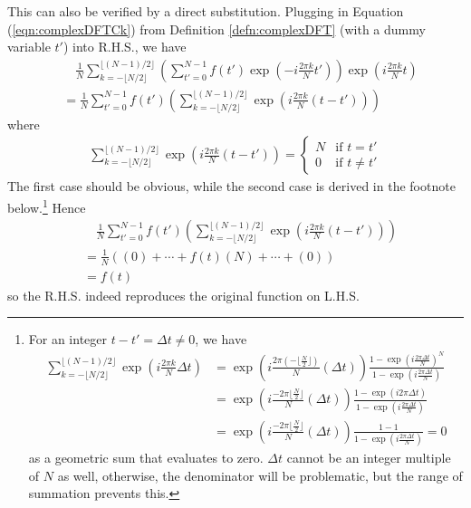 This can also be verified by a direct substitution. Plugging in Equation (\ref{eqn:complexDFTCk}) from Definition \ref{defn:complexDFT} (with a dummy variable $t'$) into R.H.S., we have
\begin{align*}
&\quad \frac{1}{N}\sum_{k= -\lfloor N/2 \rfloor}^{\lfloor (N-1)/2 \rfloor} \left(\sum_{t'=0}^{N-1} f(t')\exp(-i\frac{2\pi k}{N}t')\right) \exp(i\frac{2\pi k}{N}t) \\
&= \frac{1}{N} \sum_{t'=0}^{N-1} f(t') \left(\sum_{k= -\lfloor N/2 \rfloor}^{\lfloor (N-1)/2 \rfloor} \exp(i\frac{2\pi k}{N}(t-t'))\right)
\end{align*}
where
\begin{align}
\sum_{k= -\lfloor N/2 \rfloor}^{\lfloor (N-1)/2 \rfloor} \exp(i\frac{2\pi k}{N}(t-t')) = 
\begin{cases}
N & \text{if $t = t'$} \\
0 & \text{if $t \neq t'$}
\end{cases} \label{eqn:DFTdoublesum}
\end{align}
The first case should be obvious, while the second case is derived in the footnote below.\footnote{
For an integer $t - t' = \Delta t \neq 0$, we have
\begin{align*}
\sum_{k= -\lfloor N/2 \rfloor}^{\lfloor (N-1)/2 \rfloor} \exp(i \frac{2\pi k}{N}\Delta t) 
&= \exp(i \frac{2\pi (-\lfloor \frac{N}{2} \rfloor)}{N}(\Delta t)) \frac{1 - \exp(i \frac{2\pi \Delta t}{N})^N}{1 - \exp(i \frac{2\pi \Delta t}{N})} \\
&= \exp(i \frac{-2\pi \lfloor \frac{N}{2} \rfloor}{N}(\Delta t)) \frac{1 - \exp(i 2\pi \Delta t)}{1 - \exp(i\frac{2\pi \Delta t}{N})} \\
&= \exp(i\frac{-2\pi \lfloor \frac{N}{2} \rfloor}{N}(\Delta t)) \frac{1 - 1}{1 - \exp(i\frac{2\pi \Delta t}{N})} = 0
\end{align*}
as a geometric sum that evaluates to zero. $\Delta t$ cannot be an integer multiple of $N$ as well, otherwise, the denominator will be problematic, but the range of summation prevents this.} Hence
\begin{align*}
&\quad \frac{1}{N} \sum_{t'=0}^{N-1} f(t') \left(\sum_{k= -\lfloor N/2 \rfloor}^{\lfloor (N-1)/2 \rfloor} \exp(i \frac{2\pi k}{N}(t-t'))\right) \\
&= \frac{1}{N} ((0) + \cdots + f(t) (N) + \cdots + (0)) \\
&= f(t)   
\end{align*}
so the R.H.S. indeed reproduces the original function on L.H.S.


